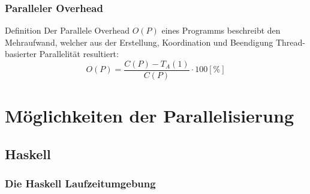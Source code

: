 \documentclass[presentation, shownotes]{beamer}
\begin{document}
\begin{frame}
\frametitle{Paralleler Overhead}
    \begin{block}{Definition}
    Der Parallele Overhead $O(P)$ eines Programms beschreibt den Mehraufwand, welcher aus der Erstellung, Koordination und Beendigung Thread- basierter Parallelität resultiert:
    $$O(P) = \frac{C(P) - T_A(1)}{C(P)} \cdot 100 [\%]$$
    \end{block}
\end{frame}

\section[Parallelisierung]{Möglichkeiten der Parallelisierung}

\begin{frame}
\tableofcontents[currentsection]
\end{frame}

\setcounter{subsection}{1}
\subsection{Haskell}

\begin{frame}
\frametitle{Die Haskell Laufzeitumgebung}

\end{frame}
\end{document}
